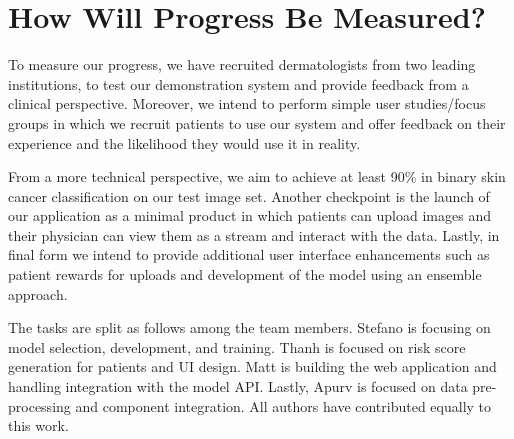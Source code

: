 \documentclass[a4paper,10pt]{article}
\begin{document}
\section{How Will Progress Be Measured?}
To measure our progress, we have recruited dermatologists from two leading
institutions, to test our demonstration system and provide feedback from a
clinical perspective. Moreover, we intend to perform simple user studies/focus
groups in which we recruit patients to use our system and offer feedback on
their experience and the likelihood they would use it in reality.

From a more technical perspective, we aim to achieve at least 90\% in binary
skin cancer classification on our test image set. Another checkpoint is the
launch of our application as a minimal product in which patients can upload
images and their physician can view them as a stream and interact with the
data. Lastly, in final form we intend to provide additional user interface
enhancements such as patient rewards for uploads and development of the model
using an ensemble approach.

The tasks are split as follows among the team members. Stefano is focusing on
model selection, development, and training. Thanh is focused on risk score
generation for patients and UI design. Matt is building the web application and
handling integration with the model API. Lastly, Apurv is focused on data
pre-processing and component integration. All authors have contributed equally
to this work.


\end{document}
